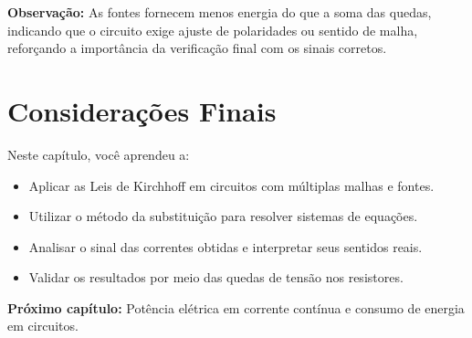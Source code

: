 \textbf{Observação:} As fontes fornecem menos energia do que a soma das quedas, indicando que o circuito exige ajuste de polaridades ou sentido de malha, reforçando a importância da verificação final com os sinais corretos.

\section{Considerações Finais}

Neste capítulo, você aprendeu a:

\begin{itemize}
    \item Aplicar as Leis de Kirchhoff em circuitos com múltiplas malhas e fontes.
    \item Utilizar o método da substituição para resolver sistemas de equações.
    \item Analisar o sinal das correntes obtidas e interpretar seus sentidos reais.
    \item Validar os resultados por meio das quedas de tensão nos resistores.
\end{itemize}

\vspace{0.5cm}
\noindent\textbf{Próximo capítulo:} Potência elétrica em corrente contínua e consumo de energia em circuitos.